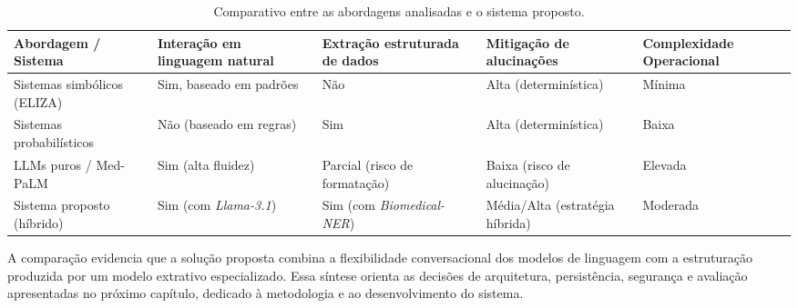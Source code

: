 \begin{table}[htb]
\centering
\caption{Comparativo entre as abordagens analisadas e o sistema proposto.}
\label{tab:comparativo-trabalhos}
\begin{tabularx}{\textwidth}{p{3.5cm}Y Y Y Y}
\hline
Abordagem / Sistema & Interação em linguagem natural & Extração estruturada de dados & Mitigação de alucinações & Complexidade Operacional \\
\hline
Sistemas simbólicos (ELIZA) & Sim, baseado em padrões & Não & Alta (determinística) & Mínima \\
Sistemas probabilísticos & Não (baseado em regras) & Sim & Alta (determinística) & Baixa \\
LLMs puros / Med-PaLM & Sim (alta fluidez) & Parcial (risco de formatação) & Baixa (risco de alucinação) & Elevada \\
Sistema proposto (híbrido) & Sim (com \textit{Llama-3.1}) & Sim (com \textit{Biomedical-NER}) & Média/Alta (estratégia híbrida) & Moderada \\
\hline
\end{tabularx}
\end{table}

A comparação evidencia que a solução proposta combina a flexibilidade conversacional dos modelos
de linguagem com a estruturação produzida por um modelo extrativo especializado. Essa síntese
orienta as decisões de arquitetura, persistência, segurança e avaliação apresentadas no próximo
capítulo, dedicado à metodologia e ao desenvolvimento do sistema.
